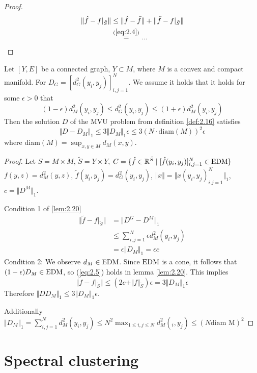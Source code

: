 \begin{proof}
\begin{align*}
    \Vert \hat{f}-f\vert_{\tilde{S}}\Vert&\leq \Vert \hat{f}-\tilde{f}\Vert+\Vert\tilde{f}-f\vert_{\tilde{S}}\Vert\\
    &\stackrel{(\ref{eq:2.4})}{=} ... 
\end{align*}    
\end{proof}


\begin{theorem}\label{thm:2.21}
    Let $[Y,E]$ be a connected graph, $Y\subset M$, where $M$ is a convex and compact manifold. For $D_G=[d_G^2(y_i,y_j)]_{i,j=1}^N$.
    We assume it holds that it holds for some $\epsilon>0$ that 
    \[(1-\epsilon)d_M^2(y_i,y_j)\leq d_G^2(y_i,y_j)\leq (1+\epsilon)d_M^2(y_i,y_j)\]
    Then the solution $D$ of the MVU problem from definition \ref{def:2.16} satisfies 
    \[\Vert D-D_M\Vert_1 \leq 3\Vert D_M\Vert_1\epsilon\leq 3(N\cdot\text{diam}(M))^2\epsilon\]
    where diam$(M)=\sup_{x,y\in M}d_M(x,y)$.
\end{theorem}

\begin{proof}
    Let $S=M\times M$, $\tilde{S}=Y\times Y$, $C=\{\hat{f}\in\mathbb{R}^{\tilde{S}}\mid [\hat{f}(y_i,y_j)]_{i,j=1}^N\in \text{EDM}\}$
    $f(y,z)=d_M^2(y,z)$, $\tilde{f}(y_i,y_j)=d_G^2(y_i,y_j)$, $\Vert x\Vert = \Vert x(y_i,y_j)_{i.j=1}^N\Vert_1$, $c=\Vert D^M\Vert_1$.

    Condition 1 of \ref{lem:2.20} \begin{align*}
        \Vert \tilde{f}-f\vert_{\tilde{S}}\Vert&=\Vert D^G-D^M\Vert_1\\
        &\leq \sum_{i,j=1}^N \epsilon d_M^2(y_i,y_j)\\
        &=\epsilon \Vert D_M\Vert_1=\epsilon c
    \end{align*}
Condition 2: We observe $d_M\in \text{EDM}$. Since $\text{EDM}$ is a cone, it follows that $(1-\epsilon)D_M\in\text{EDM}$, so (\ref{eq:2.5}) holds in 
lemma \ref{lem:2.20}. This implies 
\[\Vert \tilde{f}-f\vert_{\tilde{S}}\Vert\leq (2c+\Vert f\Vert_{\tilde{S}})\epsilon=3\Vert D_M\Vert_1\epsilon\]
Therefore $\Vert DD_M\Vert_1\leq 3\Vert D_M\Vert_1 \epsilon$.

Additionally $\Vert D_M\Vert_1=\sum_{i,j=1}^N d_M^2(y_i,y_j)\leq N^2 \max_{1\leq i,j\leq N} d_M^2(_i,y_j)\leq (N\text{diam M})^2$ 
\end{proof}


\section{Spectral clustering}

